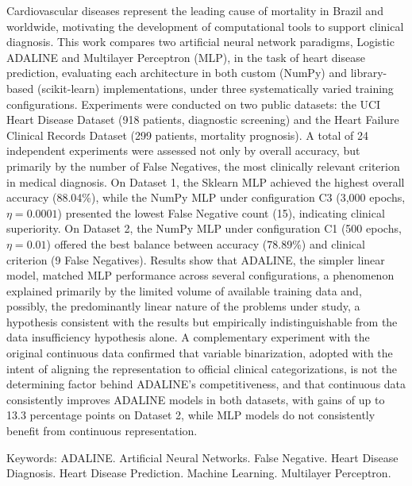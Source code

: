 \begin{resumo}[Abstract]
Cardiovascular diseases represent the leading cause of mortality in Brazil and worldwide, motivating the development of computational tools to support clinical diagnosis. This work compares two artificial neural network paradigms, Logistic ADALINE and Multilayer Perceptron (MLP), in the task of heart disease prediction, evaluating each architecture in both custom (NumPy) and library-based (scikit-learn) implementations, under three systematically varied training configurations. Experiments were conducted on two public datasets: the UCI Heart Disease Dataset (918 patients, diagnostic screening) and the Heart Failure Clinical Records Dataset (299 patients, mortality prognosis). A total of 24 independent experiments were assessed not only by overall accuracy, but primarily by the number of False Negatives, the most clinically relevant criterion in medical diagnosis. On Dataset 1, the Sklearn MLP achieved the highest overall accuracy (88.04\%), while the NumPy MLP under configuration C3 (3,000 epochs, $\eta = 0{.}0001$) presented the lowest False Negative count (15), indicating clinical superiority. On Dataset 2, the NumPy MLP under configuration C1 (500 epochs, $\eta = 0{.}01$) offered the best balance between accuracy (78.89\%) and clinical criterion (9 False Negatives). Results show that ADALINE, the simpler linear model, matched MLP performance across several configurations, a phenomenon explained primarily by the limited volume of available training data and, possibly, the predominantly linear nature of the problems under study, a hypothesis consistent with the results but empirically indistinguishable from the data insufficiency hypothesis alone. A complementary experiment with the original continuous data confirmed that variable binarization, adopted with the intent of aligning the representation to official clinical categorizations, is not the determining factor behind ADALINE's competitiveness, and that continuous data consistently improves ADALINE models in both datasets, with gains of up to 13.3 percentage points on Dataset 2, while MLP models do not consistently benefit from continuous representation.

\noindent Keywords: ADALINE. Artificial Neural Networks. False Negative. Heart Disease Diagnosis. Heart Disease Prediction. Machine Learning. Multilayer Perceptron.
\end{resumo}
